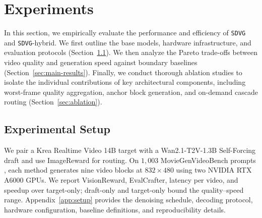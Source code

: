 \documentclass{article} %
\begin{document}

\section{Experiments}
\label{sec:experiments}

In this section, we empirically evaluate the performance and efficiency of \texttt{SDVG} and \texttt{SDVG}-hybrid. We first outline the base models, hardware infrastructure, and evaluation protocols (Section~\ref{sec:setup}). We then analyze the Pareto trade-offs between video quality and generation speed against boundary baselines (Section~\ref{sec:main-results}). Finally, we conduct thorough ablation studies to isolate the individual contributions of key architectural components, including worst-frame quality aggregation, anchor block generation, and on-demand cascade routing (Section~\ref{sec:ablation}).

\subsection{Experimental Setup}
\label{sec:setup}

We pair a Krea Realtime Video 14B target \citep{krea_realtime_14b} with a Wan2.1-T2V-1.3B Self-Forcing draft and use ImageReward \citep{xu2023imagerewardlearningevaluatinghuman} for routing. On $1{,}003$ MovieGenVideoBench prompts \citep{polyak2024movie}, each method generates nine video blocks at $832\times480$ using two NVIDIA RTX A6000 GPUs. We report VisionReward, EvalCrafter, latency per video, and speedup over target-only; draft-only and target-only bound the quality--speed range. Appendix~\ref{app:setup} provides the denoising schedule, decoding protocol, hardware configuration, baseline definitions, and reproducibility details.


\end{document}
